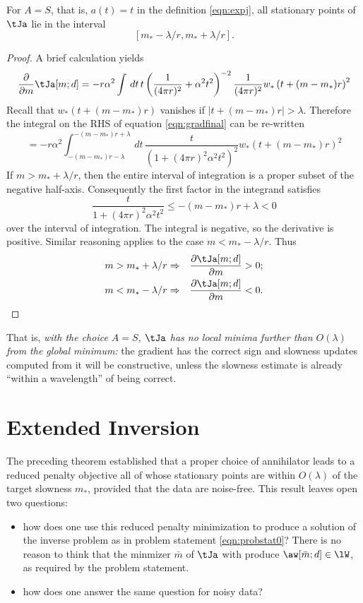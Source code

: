 \begin{theorem}
  \label{thm:rampgood}
  For $A=S$, that is, $a(t)=t$ in the definition \ref{eqn:expj}, all
  stationary points of $\tJa$ lie in the interval
  \[
    [m_*-\lambda/r, m_*+\lambda/r].
  \]
\end{theorem}
\begin{proof}
  A brief calculation yields
\begin{equation}
\label{eqn:gradfinal}
\frac{\partial}{\partial m}\tJa[m;d] = -r\alpha^2\int \,dt\,t\left(\frac{1}{(4\pi r)^2} + \alpha^2 t^2\right)^{-2}\frac{1}{(4\pi r)^2}w_*\left(t+(m-m_*)r\right)^2
\end{equation}
Recall that $w_*(t+(m-m_*)r)$
vanishes if $|t+(m-m_*)r| > \lambda$. Therefore the integral on the
RHS of equation \ref{eqn:gradfinal} can be re-written
\[
  = -r\alpha^2\int_{-(m-m_*)r-\lambda}^{-(m-m_*)r+\lambda}
  \,dt\, \frac{t}{(1+(4\pi r)^2\alpha^2 t^2)^2}w_*\left(t+(m-m_*)r\right)^2
\]
If $m > m_*+\lambda/r$, then the entire interval of integration is a proper
subset of the negative half-axis. Consequently the first factor in the
integrand satisfies
\[
 \frac{t}{1+(4\pi r)^2\alpha^2 t^2}
  \le -(m-m_*)r+\lambda < 0
\]
over the interval of integration. The integral is
negative, so the derivative
is positive. Similar reasoning applies to the case $m <
m_*-\lambda/r$. Thus
\begin{eqnarray}
  m > m_*+\lambda/r & \Rightarrow & \frac{\partial \tJa[m;d]}{\partial
    m}> 0; \nonumber\\
  m < m_*-\lambda/r & \Rightarrow & \frac{\partial \tJa[m;d]}{\partial
                                    m}< 0.
\label{eqn:leftright}
\end{eqnarray}
\end{proof}

 That is, {\em with the choice $A=S$, $\tJa$ has no local minima
  further than  $O(\lambda)$ from the global minimum:} the gradient
has the correct sign and slowness updates computed from it will be
constructive, unless the slowness estimate is already ``within a
wavelength'' of being correct.


\section{Extended Inversion}
The preceding theorem established that a proper choice of annihilator leads to a
reduced penalty objective all of whose stationary points are within
$O(\lambda)$ of the target slowness $m_*$, provided that the data are
noise-free. This result leaves open two questions:
\begin{itemize}
\item how does one use this reduced penalty minimization to produce
  a solution of the inverse problem as in problem statement
  \ref{eqn:probstat0}? There is no reason to think that the minmizer
  $\bar{m}$ of $\tJa$ with produce $\aw[\bar{m};d] \in \lW$, as
  required by the problem statement.
\item how does one answer the same question for noisy data?
\end{itemize}

